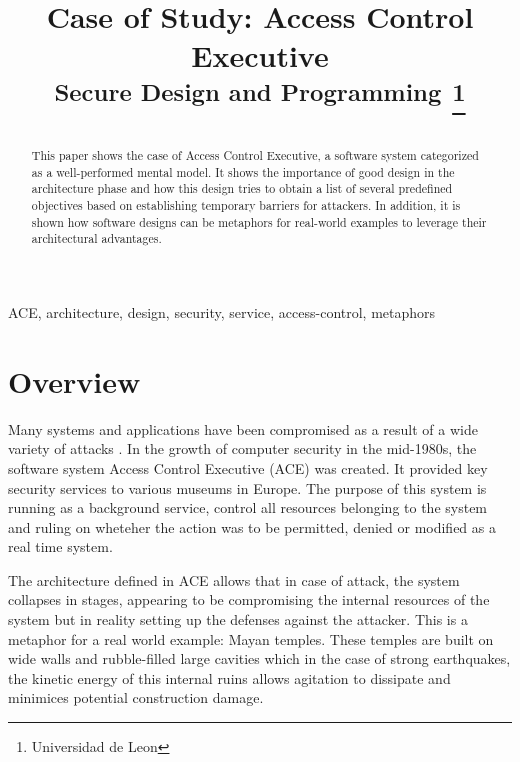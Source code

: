 \documentclass[conference]{IEEEtran}
\begin{document}
\title{Case of Study: Access Control Executive\\
{\footnotesize \textsuperscript{Secure Design and Programming}
\thanks{Universidad de Leon}
}

\author{
}
}

\maketitle

\begin{abstract}

This paper shows the case of Access Control Executive, a software system categorized as a well-performed mental model. It shows the importance of good design in the architecture phase and how this design tries to obtain a list of several predefined objectives based on establishing temporary barriers for attackers. In addition, it is shown how software designs can be metaphors for real-world examples to leverage their architectural advantages. 
\end{abstract}

\begin{IEEEkeywords}
ACE, architecture, design, security, service, access-control, metaphors
\end{IEEEkeywords}

\section{Overview}

Many systems and applications have been compromised as a result of a wide variety of attacks \cite{b1}. In the growth of computer security in the mid-1980s, the software system Access Control Executive (ACE) was created. It provided key security services to various museums in Europe. The purpose of this system is running as a background service, control all resources belonging to the system and ruling on wheteher the action was to be permitted, denied or modified as a real time system.

The architecture defined in ACE allows that in case of attack, the system collapses in stages, appearing to be compromising the internal resources of the system but in reality setting up the defenses against the attacker. This is a metaphor for a real world example: Mayan temples. These temples are built on wide walls and rubble-filled large cavities which in the case of strong earthquakes, the kinetic energy of this internal ruins allows agitation to dissipate and minimices potential construction damage.
\end{document}
